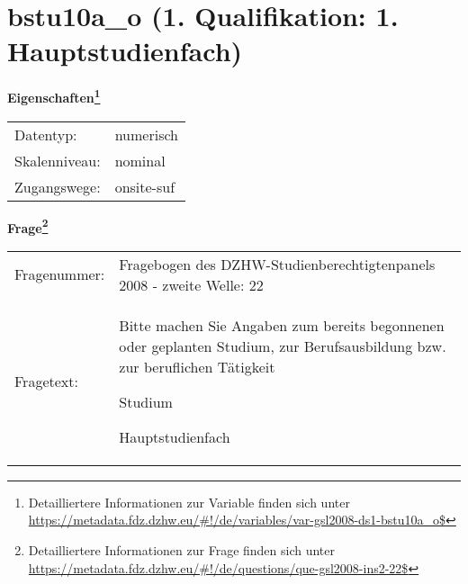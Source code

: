 
    \setcounter{footnote}{0}

    \vspace*{-1.8cm}
	\section{bstu10a\_o (1. Qualifikation: 1. Hauptstudienfach)}
	\label{section:bstu10a_o}



    \vspace*{0.5cm}
    \noindent\textbf{Eigenschaften\footnote{Detailliertere Informationen zur Variable finden sich unter
		\url{https://metadata.fdz.dzhw.eu/\#!/de/variables/var-gsl2008-ds1-bstu10a_o$}}}\\
	\begin{tabularx}{\hsize}{@{}lX}
	Datentyp: & numerisch \\
	Skalenniveau: & nominal \\
	Zugangswege: &
	  onsite-suf
 \\
    \end{tabularx}



				\vspace*{0.5cm}
                \noindent\textbf{Frage\footnote{Detailliertere Informationen zur Frage finden sich unter
		              \url{https://metadata.fdz.dzhw.eu/\#!/de/questions/que-gsl2008-ins2-22$}}}\\
				\begin{tabularx}{\hsize}{@{}lX}
					Fragenummer: &
					  Fragebogen des DZHW-Studienberechtigtenpanels 2008 - zweite Welle:
					  22
 \\
					Fragetext: & Bitte machen Sie Angaben zum bereits begonnenen oder geplanten Studium, zur Berufsausbildung bzw. zur beruflichen Tätigkeit\par  Studium\par  Hauptstudienfach \\
				\end{tabularx}





